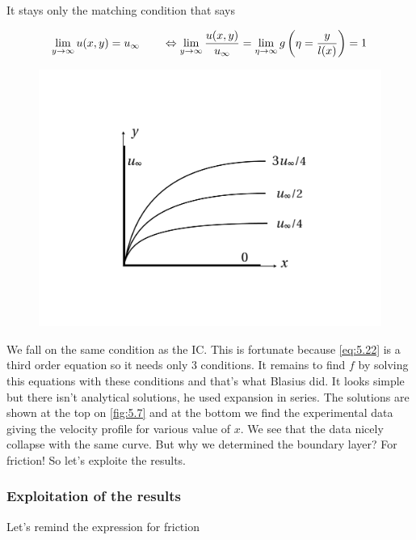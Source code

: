 			It stays only the matching condition that says 
			
			\begin{equation}
				\lim _{y \rightarrow \infty} u(x,y) = \uinf \qquad \Leftrightarrow \lim _{y \rightarrow \infty} \frac{u(x,y)}{\uinf} = \lim _{\eta \rightarrow \infty} g\left( \eta = \frac{y}{l(x)}\right) = 1
			\end{equation}
			
			\begin{figure}
			\vspace{-5mm}
			\includegraphics[scale=0.23]{ch5/6}
			\label{fig:5.7}
			\end{figure}
			We fall on the same condition as the IC. This is fortunate because \eqref{eq:5.22} is a third order equation so it needs only 3 conditions. It remains to find $f$ by solving this equations with these conditions and that's what Blasius did. It looks simple but there isn't analytical solutions, he used expansion in series. The solutions are shown at the top on \autoref{fig:5.7} and at the bottom we find the experimental data giving the velocity profile for various value of $x$. We see that the data nicely collapse with the same curve. But why we determined the boundary layer? For friction! So let's exploite the results.
			
		\subsubsection{Exploitation of the results} 
			Let's remind the expression for friction 
			

